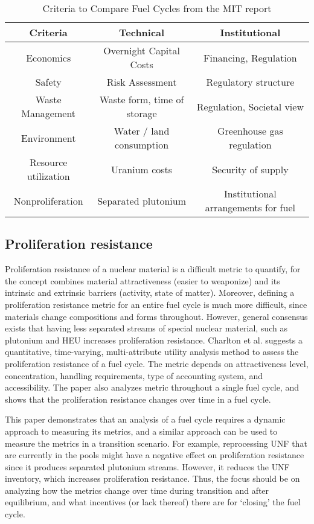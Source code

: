 \begin{table}[h]
    \centering
    \label{tab:mit}
    \caption{Criteria to Compare Fuel Cycles from the MIT report \cite{kazimi_future_2011}}
    \begin{tabular}{ccc}
        \hline
        \textbf{Criteria} & \textbf{Technical} & \textbf{Institutional}\\ \hline
        Economics & Overnight Capital Costs & Financing, Regulation \\
        Safety & Risk Assessment & Regulatory structure \\
        Waste Management & Waste form, time of storage & Regulation, Societal view \\
        Environment & Water / land consumption & Greenhouse gas regulation \\
        Resource utilization & Uranium costs & Security of supply \\
        Nonproliferation & Separated plutonium & Institutional arrangements for fuel \\
        \hline
    \end{tabular}
\end{table}

\subsection{Proliferation resistance}

Proliferation resistance of a nuclear material is a difficult
metric to quantify,
for the concept combines material attractiveness (easier to weaponize)
and its intrinsic and extrinsic barriers (activity, state of matter).
Moreover, defining a proliferation resistance metric for an
entire fuel cycle is much more difficult, since materials change
compositions and forms throughout. However, general consensus exists
that having less separated streams of special nuclear material, such
as plutonium and \gls{HEU} increases proliferation resistance.
Charlton et al. \cite{charlton_proliferation_2007} suggests a
quantitative, time-varying, multi-attribute utility analysis method
to assess the proliferation resistance of a fuel cycle. The metric
depends on attractiveness level, concentration, handling requirements,
type of accounting system, and accessibility. The paper also analyzes
metric throughout a single fuel cycle, and shows that the proliferation
resistance changes over time in a fuel cycle.

This paper demonstrates that an analysis of a fuel cycle requires
a dynamic approach to measuring its metrics, and a similar approach
can be used to measure the metrics in a transition scenario.
For example, reprocessing \gls{UNF} that are currently in the
pools might have a negative effect on proliferation resistance
since it produces separated plutonium streams. However, it reduces
the \gls{UNF} inventory, which increases proliferation resistance.
Thus, the focus should be on analyzing how the metrics change
over time during transition and after equilibrium, and what
incentives (or lack thereof) there are for `closing' the fuel cycle.

